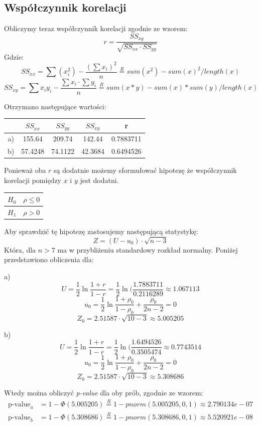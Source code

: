 \documentclass{article}
\begin{document}
\subsection{Współczynnik korelacji}
Obliczymy teraz współczynnik korelacji zgodnie ze wzorem:
\[ r = \frac{SS_{xy}}{\sqrt{SS_{xx} \cdot SS_{yy}}} \]
Gdzie:
\[ SS_{xx} = \sum (x_i^2) - \frac{(\sum x_i )^2}{n} \overset{R}{=} sum(x^2) - sum(x)^2/length(x) \]
\[ SS_{xy} = \sum x_i y_i - \frac{\sum x_i \cdot \sum y_i}{n} \overset{R}{=} sum(x*y) - sum(x)*sum(y)/length(x) \]

Otrzymano następujące wartości:
\begin{center} \begin{tabular}{|c|c|c|c|c|} \hline
 & $SS_{xx}$ & $SS_{yy}$ & $SS_{xy}$ & r \\ \hline
a) & 155.64 & 209.74 & 142.44 & 0.7883711 \\ \hline
b) & 57.4248 & 74.1122 & 42.3684 & 0.6494526 \\ \hline
\end{tabular} \end{center}

Ponieważ oba $r$ są dodatnie możemy sformułować hipotezę że współczynnik korelacji pomiędzy $x$ i $y$ jest dodatni.
\begin{center} \begin{tabular}{|c|c|} \hline
$H_0$ & $\rho \leq 0$ \\ \hline
$H_1$ & $\rho > 0$ \\ \hline
\end{tabular} \end{center}

Aby sprawdzić tę hipotezę zastosujemy następującą statystykę:
\[ Z = (U - u_0) \cdot \sqrt{n-3} \]
Która, dla $n > 7$ ma w przybliżeniu standardowy rozkład normalny. Poniżej przedstawiono obliczenia dla: \\ \par
a)
\[U = \frac{1}{2} \ln \frac{1+r}{1-r} = \frac{1}{2} \ln(\frac{1.7883711}{0.2116289} \approx 1.067113 \]
\[ u_0 = \frac{1}{2} \ln \frac{1+\rho_0}{1-\rho_0} + \frac{\rho_0}{2n-2} = 0 \]
\[ Z_0 = 2.51587 \cdot \sqrt{10 -3} \approx 5.005205 \]

b)
\[U = \frac{1}{2} \ln \frac{1+r}{1-r} = \frac{1}{2} \ln(\frac{1.6494526}{0.3505474} \approx 0.7743514 \]
\[ u_0 = \frac{1}{2} \ln \frac{1+\rho_0}{1-\rho_0} + \frac{\rho_0}{2n-2} = 0 \]
\[ Z_0 = 2.51587 \cdot \sqrt{10 -3} \approx 5.308686 \]

Wtedy można obliczyć \textit{p-value} dla oby prób, zgodnie ze wzorem:
\begin{align*} \text{p-value}_a & = 1 - \Phi(5.005205) \overset{R}{=} 1 - pnorm(5.005205, 0, 1) \approx 2.790134e-07 \\
\text{p-value}_b & = 1 - \Phi(5.308686) \overset{R}{=} 1 - pnorm(5.308686, 0, 1) \approx 5.520921e-08 \end{align*}
\end{document}
